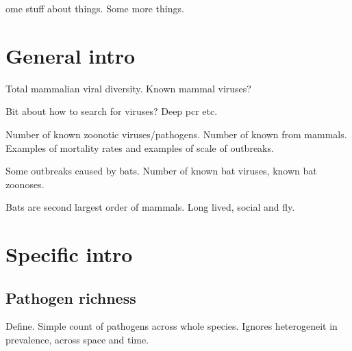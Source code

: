 

ome stuff about things. Some more things.  \blindtext

\section{General intro}

Total mammalian viral diversity.
Known mammal viruses?

Bit about how to search for viruses? Deep pcr etc.



Number of known zoonotic viruses/pathogens.
Number of known from mammals.
Examples of mortality rates and examples of scale of outbreaks.


Some outbreaks caused by bats.
Number of known bat viruses, known bat zoonoses.

Bats are second largest order of mammals.
Long lived, social and fly.


\section{Specific  intro}
\subsection{Pathogen richness}

Define.
Simple count of pathogens across whole species.
Ignores heterogeneit in prevalence, across space and time.










